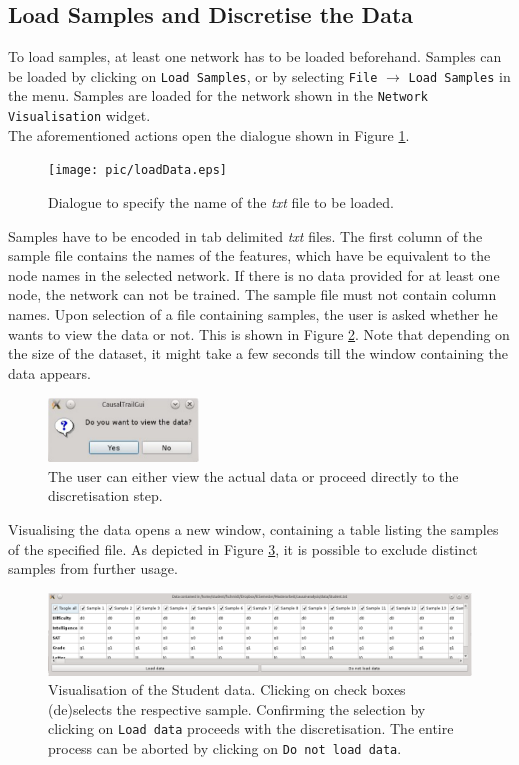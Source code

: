 \subsection{Load Samples and Discretise the Data}
\label{subsection:loadSamplesDiscretise}
To load samples, at least one network has to be loaded beforehand. Samples can be loaded by clicking 
on \texttt{Load Samples}, or by selecting \texttt{File} $\rightarrow$ \texttt{Load Samples} in the menu. 
Samples are loaded for the network shown in the \texttt{Network Visualisation} widget.
\\The aforementioned actions open the dialogue shown in Figure \ref{figure:loadData1}.
\begin{figure}[H]
\begin{center}
 \texttt{[image: pic/loadData.eps]}
 \caption{Dialogue to specify the name of the \textit{txt} file to be loaded.}
 \label{figure:loadData1}
\end{center}
\end{figure}
\noindent
Samples have to be encoded in  tab delimited \textit{txt} files. The first column of the sample file contains the names of the features, which have be equivalent to the node names in the selected network.
If there is no data provided for at least one node, the network can not be trained. The sample file must not contain column names. 
Upon selection of a file containing samples, the user is asked whether he wants to view the data or not. This is shown in Figure \ref{figure:loadData2}. Note that depending on the size of the dataset,
it might take a few seconds till the window containing the data appears.
\begin{figure}[H]
 \begin{center}
 \includegraphics[width=4cm]{pic/dialogViewData.eps}
 \caption{The user can either view the actual data or proceed directly to the discretisation step.}
 \label{figure:loadData2}
 \end{center}
\end{figure}
\noindent
Visualising the data opens a new window, containing a table listing the samples of the specified file. As depicted in Figure \ref{figure:loadData3}, it is possible to exclude distinct samples from further usage.
\begin{figure}[H]
 \begin{center}
 \includegraphics[width=\textwidth]{pic/dataView.eps}
 \caption{Visualisation of the Student data. Clicking on check boxes (de)selects the respective sample. Confirming the selection by clicking on \texttt{Load data} proceeds with the discretisation. The entire process
 can be aborted by clicking on \texttt{Do not load data}.}
 \label{figure:loadData3}
 \end{center}
\end{figure}
